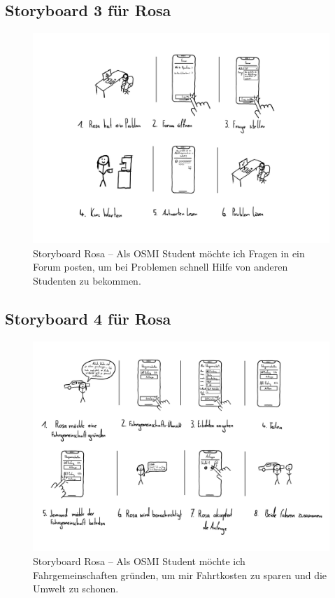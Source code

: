 \documentclass{article}
\begin{document}
\newpage

\subsection{Storyboard 3 für Rosa}

\begin{figure}[h]
	\includegraphics[width=\textwidth]{storyboard-3-rosa}
	\centering
	\caption{Storyboard Rosa – Als OSMI Student möchte ich Fragen in ein Forum posten, um bei Problemen schnell Hilfe von anderen Studenten zu bekommen.}
\end{figure}

\newpage

\subsection{Storyboard 4 für Rosa}

\begin{figure}[h]
	\includegraphics[width=\textwidth]{storyboard-4-rosa}
	\centering
	\caption{Storyboard Rosa – Als OSMI Student möchte ich Fahrgemeinschaften gründen, um mir Fahrtkosten zu sparen und die Umwelt zu schonen.}
\end{figure}
\end{document}
